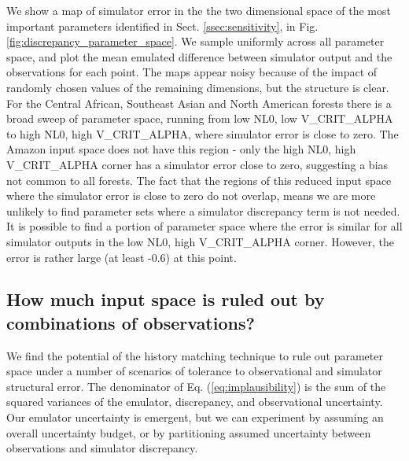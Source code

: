 \documentclass[esd, manuscript]{copernicus}
\begin{document}
We show a map of simulator error in the the two dimensional space of the most important parameters identified in Sect. \ref{ssec:sensitivity}, in Fig. \ref{fig:discrepancy_parameter_space}. We sample uniformly across all parameter space, and plot the mean emulated difference between simulator output and the observations for each point. The maps appear noisy because of the impact of randomly chosen values of the remaining dimensions, but the structure is clear. For the Central African, Southeast Asian and North American forests there is a broad sweep of parameter space, running from low NL0, low V\_CRIT\_ALPHA to high NL0, high V\_CRIT\_ALPHA, where simulator error is close to zero. The Amazon input space does not have this region - only the high NL0, high V\_CRIT\_ALPHA corner has a simulator error close to zero, suggesting a bias not common to all forests. The fact that the regions of this reduced input space where the simulator error is close to zero do not overlap, means we are more unlikely to find parameter sets where a simulator discrepancy term is not needed. It is possible to find a portion of parameter space where the error is similar for all simulator outputs in the low NL0, high V\_CRIT\_ALPHA corner. However, the error is rather large (at least -0.6) at this point.


\subsection{How much input space is ruled out by combinations of observations?}\label{ssec:combination}
We find the potential of the history matching technique to rule out parameter space under a number of scenarios of tolerance to observational and simulator structural error. The denominator of Eq. (\ref{eq:implausibility}) is the sum of the squared variances of the emulator, discrepancy, and observational uncertainty. Our emulator uncertainty is emergent, but we can experiment by assuming an overall uncertainty budget, or by partitioning assumed uncertainty between observations and simulator discrepancy.
\end{document}

